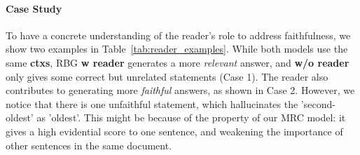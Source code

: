 \documentclass[11pt]{article}
\begin{document}
\vspace{-6pt}
\paragraph{Case Study} To have a concrete understanding of the reader's role to address faithfulness, we show two examples in Table~\ref{tab:reader_examples}. While both models use the same \textbf{ctxs}, RBG \textbf{w reader} generates a more \textit{relevant} answer, and \textbf{w/o reader} only gives some correct but unrelated statements (Case 1). The reader also contributes to generating more \textit{faithful} answers, as shown in Case 2. However, we notice that there is one unfaithful statement, which hallucinates the 'second-oldest' as 'oldest'. This might be because of the property of our MRC model: it gives a high evidential score to one sentence, and weakening the importance of other sentences in the same document.
\end{document}
